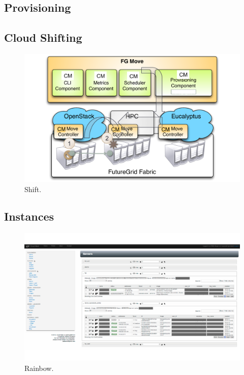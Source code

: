 \subsection{Provisioning}

\subsection{Cloud Shifting}

\begin{figure}[h!]
  \centering
    \includegraphics[width=1.0\textwidth]{images/shift2.pdf}
  \caption{Shift.}
\end{figure}

\subsection{Instances}

\begin{figure}[h!]
  \centering
    \includegraphics[width=1.0\textwidth]{images/instances.pdf}
  \caption{Rainbow.}
\end{figure}

